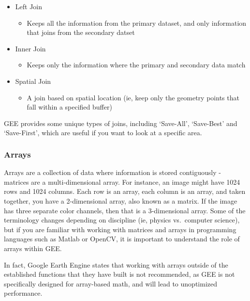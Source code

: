 \documentclass[
]{article}
\providecommand{\tightlist}{%
  \setlength{\itemsep}{0pt}\setlength{\parskip}{0pt}}
\begin{document}
\begin{itemize}
\tightlist
\item
  Left Join

  \begin{itemize}
  \tightlist
  \item
    Keeps all the information from the primary dataset, and only information that joins from the secondary datset
  \end{itemize}
\item
  Inner Join

  \begin{itemize}
  \tightlist
  \item
    Keeps only the information where the primary and secondary data match
  \end{itemize}
\item
  Spatial Join

  \begin{itemize}
  \tightlist
  \item
    A join based on spatial location (ie, keep only the geometry points that fall within a specified buffer)
  \end{itemize}
\end{itemize}

GEE provides some unique types of joins, including `Save-All', `Save-Best' and `Save-First', which are useful if you want to look at a specific area.

\hypertarget{arrays}{%
\subsubsection{Arrays}\label{arrays}}

Arrays are a collection of data where information is stored contiguously - matrices are a multi-dimensional array. For instance, an image might have 1024 rows and 1024 columns. Each row is an array, each column is an array, and taken together, you have a 2-dimensional array, also known as a matrix. If the image has three separate color channels, then that is a 3-dimensional array. Some of the terminology changes depending on discipline (ie, physics vs.~computer science), but if you are familiar with working with matrices and arrays in programming languages such as Matlab or OpenCV, it is important to understand the role of arrays within GEE.

In fact, Google Earth Engine states that working with arrays outside of the established functions that they have built is not recommended, as GEE is not specifically designed for array-based math, and will lead to unoptimized performance.
\end{document}
